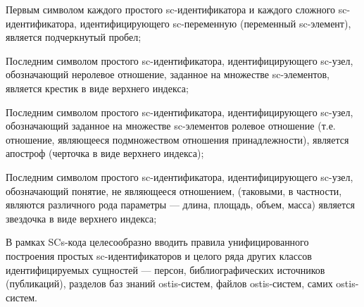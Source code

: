 \begin{SCn}
{\begin{scnitemize}
    \item Первым символом каждого простого sc-идентификатора и каждого сложного sc-идентификатора, идентифицирующего sc-переменную (переменный sc-элемент), является подчеркнутый пробел;
    \item Последним символом простого sc-идентификатора, идентифицирующего sc-узел, обозначающий неролевое отношение, заданное на множестве sc-элементов, является крестик в виде верхнего индекса;
    \item Последним символом простого sc-идентификатора, идентифицирующего sc-узел, обозначающий заданное на множестве sc-элементов ролевое отношение (т.е. отношение, являющееся подмножеством отношения принадлежности), является апостроф (черточка в виде верхнего индекса);
    \item Последним символом простого sc-идентификатора, идентифицирующего sc-узел, обозначающий понятие, не являющееся отношением, (таковыми, в частности, являются различного рода параметры — длина, площадь, объем, масса) является звездочка в виде верхнего индекса;
    \item В рамках SCs-кода целесообразно вводить правила унифицированного построения простых sc-идентификаторов и целого ряда других классов идентифицируемых сущностей — персон, библиографических источников (публикаций), разделов баз знаний ostis-систем, файлов ostis-систем, самих ostis-систем.
\end{scnitemize}}




\end{SCn}
